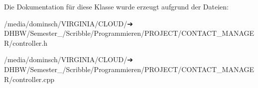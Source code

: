 Die Dokumentation für diese Klasse wurde erzeugt aufgrund der Dateien\+:\begin{DoxyCompactItemize}
\item 
/media/dominsch/\+V\+I\+R\+G\+I\+N\+I\+A/\+C\+L\+O\+U\+D/➔ D\+H\+B\+W/\+Semester\+\_/\+Scribble/\+Programmieren/\+P\+R\+O\+J\+E\+C\+T/\+C\+O\+N\+T\+A\+C\+T\+\_\+\+M\+A\+N\+A\+G\+E\+R/controller.\+h\item 
/media/dominsch/\+V\+I\+R\+G\+I\+N\+I\+A/\+C\+L\+O\+U\+D/➔ D\+H\+B\+W/\+Semester\+\_/\+Scribble/\+Programmieren/\+P\+R\+O\+J\+E\+C\+T/\+C\+O\+N\+T\+A\+C\+T\+\_\+\+M\+A\+N\+A\+G\+E\+R/controller.\+cpp\end{DoxyCompactItemize}
